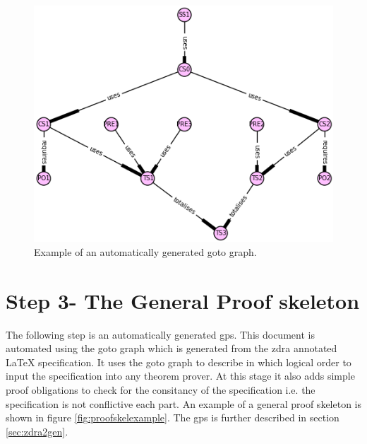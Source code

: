 \begin{figure}[H]
 \begin{center}
 \includegraphics [scale=0.4]{Figures/Design/goto.png}
 \caption{Example of an automatically generated goto graph.}
 \label{fig:gotoexamplee}
\end{center}
\end{figure} 

\section{Step 3- The General Proof skeleton}

The following step is an automatically generated \gls{gps}. This document is automated using the goto graph which is generated from the \gls{zdra} annotated \LaTeX{} specification. It uses the goto graph to describe in which logical order to input the specification into any theorem prover. At this stage it also adds simple proof obligations to check for the consitancy of the specification i.e. the specification is not conflictive each part. An example of a general proof skeleton is shown in figure \ref{fig:proofskelexample}. The \gls{gps} is further described in section \ref{sec:zdra2gen}.


